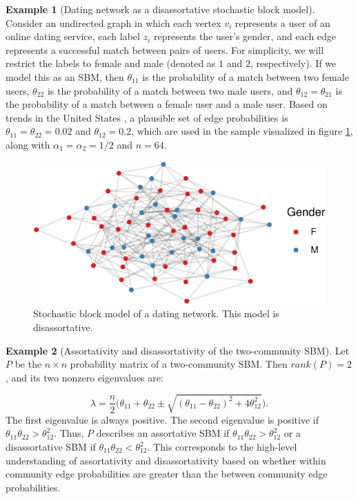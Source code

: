 \documentclass[
  12pt,
]{article}
\theoremstyle{definition}
\theoremstyle{definition}
\newtheorem{example}{Example}[section]
\theoremstyle{definition}
\theoremstyle{definition}
\theoremstyle{remark}
\begin{document}
\begin{example}[Dating network as a disassortative stochastic block model]
\label{ex:sbm-dating}
Consider an undirected graph in which each vertex $v_i$ represents a user of an online dating service, each label $z_i$ represents the user's gender, and each edge represents a successful match between pairs of users. 
For simplicity, we will restrict the labels to female and male (denoted as $1$ and $2$, respectively). 
If we model this as an SBM, then $\theta_{11}$ is the probability of a match between two female users, $\theta_{22}$ is the probability of a match between two male users, and $\theta_{12} = \theta_{21}$ is the probability of a match between a female user and a male user. 
Based on trends in the United States \citep{gallup-lgbt}, 
a plausible set of edge probabilities is $\theta_{11} = \theta_{22} = 0.02$ and $\theta_{12} = 0.2$, which are used in the sample visualized in figure \ref{fig:dating-sbm}, along with $\alpha_1 = \alpha_2 = 1/2$ and $n = 64$.

\begin{figure}[H]

{\centering \includegraphics{draft_files/figure-latex/dating-sbm-1} 

}

\caption{Stochastic block model of a dating network. This model is disassortative.}\label{fig:dating-sbm}
\end{figure}
\end{example}

\begin{example}[Assortativity and disassortativity of the two-community SBM]
\label{ex:sbm-assortativity}
Let $P$ be the $n \times n$ probability matrix of a two-community SBM. 
Then $rank(P) = 2$, and its two nonzero eigenvalues are:

\begin{equation}
\label{eq:sbm-eigenvalues}
\lambda = \frac{n}{2} \bigg( 
\theta_{11} + \theta_{22} \pm 
\sqrt{(\theta_{11} - \theta_{22})^2 + 4 \theta_{12}^2} 
\bigg).
\end{equation}
The first eigenvalue is always positive. 
The second eigenvalue is positive if $\theta_{11} \theta_{22} > \theta_{12}^2$. 
Thus, $P$ describes an assortative SBM if $\theta_{11} \theta_{22} > \theta_{12}^2$ or 
a disassortative SBM if $\theta_{11} \theta_{22} < \theta_{12}^2$. 
This corresponds to the high-level understanding of assortativity and disassortativity based on whether within community edge probabilities are greater than the between community edge probabilities. 
\end{example}
\end{document}
